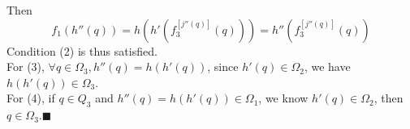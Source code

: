 \documentclass[11pt]{article}
\begin{document}
Then
\begin{equation}
    f_1(h''(q)) = h(h'(f_3^{[j''(q)]}(q))) = h''(f_3^{[j''(q)]}(q))
\end{equation}
Condition (2) is thus satisfied.\\
For (3), $\forall q \in \Omega_3, h''(q) = h(h'(q))$, since $h'(q) \in \Omega_2$, we have $h(h'(q)) \in \Omega_3$.\\
For (4), if $q\in Q_3$ and $h''(q) = h(h'(q)) \in \Omega_1$, we know $h'(q) \in \Omega_2$, then $q \in \Omega_3$.$\blacksquare$
\newpage

\end{document}

